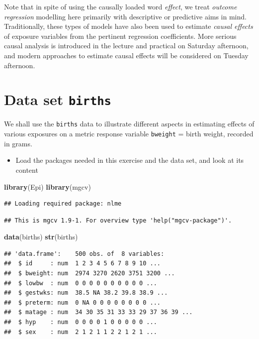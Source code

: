 \documentclass[
]{book}
\newenvironment{Shaded}{\begin{snugshade}}{\end{snugshade}}
\newcommand{\FunctionTok}[1]{\textcolor[rgb]{0.13,0.29,0.53}{\textbf{#1}}}
\newcommand{\NormalTok}[1]{#1}
\providecommand{\tightlist}{%
  \setlength{\itemsep}{0pt}\setlength{\parskip}{0pt}}
\begin{document}
Note that in spite of using the causally loaded word \emph{effect},
we treat \emph{outcome regression} modelling
here primarily with descriptive or predictive aims in mind.
Traditionally, these types of models have also been used
to estimate \emph{causal effects} of exposure variables
from the pertinent regression coefficients.
More serious causal analysis is introduced in the lecture and practical
on Saturday afternoon, and modern approaches
to estimate causal effects will be considered
on Tuesday afternoon.

\section{\texorpdfstring{Data set \texttt{births}}{Data set births}}\label{data-set-births}

We shall use the \texttt{births} data to illustrate
different aspects in estimating effects of various exposures on a metric response variable
\texttt{bweight} = birth weight, recorded in grams.

\begin{itemize}
\tightlist
\item
  Load the packages needed in this exercise and the data set, and look at its content
\end{itemize}

\begin{Shaded}
\begin{Highlighting}[]
\FunctionTok{library}\NormalTok{(Epi)}
\FunctionTok{library}\NormalTok{(mgcv)}
\end{Highlighting}
\end{Shaded}

\begin{verbatim}
## Loading required package: nlme
\end{verbatim}

\begin{verbatim}
## This is mgcv 1.9-1. For overview type 'help("mgcv-package")'.
\end{verbatim}

\begin{Shaded}
\begin{Highlighting}[]
\FunctionTok{data}\NormalTok{(births)}
\FunctionTok{str}\NormalTok{(births)}
\end{Highlighting}
\end{Shaded}

\begin{verbatim}
## 'data.frame':    500 obs. of  8 variables:
##  $ id     : num  1 2 3 4 5 6 7 8 9 10 ...
##  $ bweight: num  2974 3270 2620 3751 3200 ...
##  $ lowbw  : num  0 0 0 0 0 0 0 0 0 0 ...
##  $ gestwks: num  38.5 NA 38.2 39.8 38.9 ...
##  $ preterm: num  0 NA 0 0 0 0 0 0 0 0 ...
##  $ matage : num  34 30 35 31 33 33 29 37 36 39 ...
##  $ hyp    : num  0 0 0 0 1 0 0 0 0 0 ...
##  $ sex    : num  2 1 2 1 1 2 2 1 2 1 ...
\end{verbatim}
\end{document}
